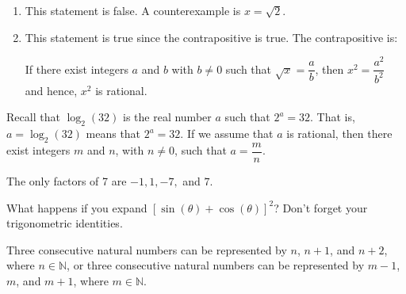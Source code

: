 \begin{list}{\bf{\ref{exer:sec33-4}.}}
\item \begin{enumerate}
\item This statement is false.  A counterexample is $x = \sqrt{2}$.
\item This statement is true since the contrapositive is true.  The contrapositive is:
If there exist integers $a$ and $b$ with $b \ne 0$ such that $\sqrt{x} = \dfrac{a}{b}$, then 
$x^2 = \dfrac{a^2}{b^2}$ and hence, $x^2$ is rational.
\end{enumerate} 
\end{list}

\begin{list}{\bf{\ref{exer:sec33-9}.}}
\item Recall that $\log _2 (32)$  is the real number  $a$  such that  $2^a  = 32$.  That is, 
$a = \log _2 (32)$  means that  $2^a  = 32$.  If we assume that  $a$ is rational, then there exist integers $m$ and $n$, with $n \ne 0$, such that $a = \dfrac{m}{n}$.
\end{list}


\begin{list}{\bf{\ref{exer:sec33IVT}.}}
\item \hint  The only factors of 7 are $-1, 1, -7,$ and $7$.
\end{list}


\begin{list}{\bf{\ref{exer:sec33-11}.}}
\item \begin{list}{\bf{(a)}}
\item What happens if you expand  $[ {\sin (\theta)  + \cos (\theta) } ]^2$?  Don't forget your trigonometric identities.
\end{list}
\end{list}


\begin{list}{\bf{\ref{exer:sec35-10}.}}
\item \hint Three consecutive natural numbers can be represented by $n$, $n + 1$, and 
$n + 2$, where $n \in \mathbb{N}$, or three consecutive natural numbers can be represented by 
$m - 1$, $m$, and $m + 1$, where $m \in \mathbb{N}$.
\end{list}
\hbreak
\renewcommand{\labelenumi}{\textbf{\arabic{enumi}.}}
\endinput
